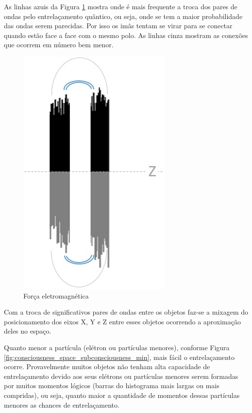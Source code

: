 As linhas azuis da Figura \ref{fig:consciousness_electromaagnetic_force} mostra onde é mais frequente a troca dos pares de ondas pelo entrelaçamento quântico, ou seja, onde se tem a maior probabilidade das ondas serem parecidas. Por isso os imãs tentam se virar para se conectar quando estão face a face com o mesmo polo. As linhas cinza mostram as conexões que ocorrem em número bem menor. 
	\begin{figure}[H]
	\caption{Força eletromagnética}
	\label{fig:consciousness_electromaagnetic_force}
	\centering
	\includegraphics[scale=.6]{sections/images/consciousness_electromaagnetic_force.jpg}
	\end{figure}

Com a troca de significativos pares de ondas entre os objetos faz-se a mixagem do posicionamento dos eixos X, Y e Z entre esses objetos ocorrendo a aproximação deles no espaço. 

Quanto menor a partícula (elétron ou partículas menores), conforme Figura \ref{fig:consciousness_space_subconsciousness_min}, mais fácil o entrelaçamento ocorre. Provavelmente muitos objetos não tenham alta capacidade de entrelaçamento devido aos seus elétrons ou partículas menores serem formadas por muitos momentos lógicos (barras do histograma mais largas ou mais compridas), ou seja, quanto maior a quantidade de momentos dessas partículas menores as chances de entrelaçamento.


